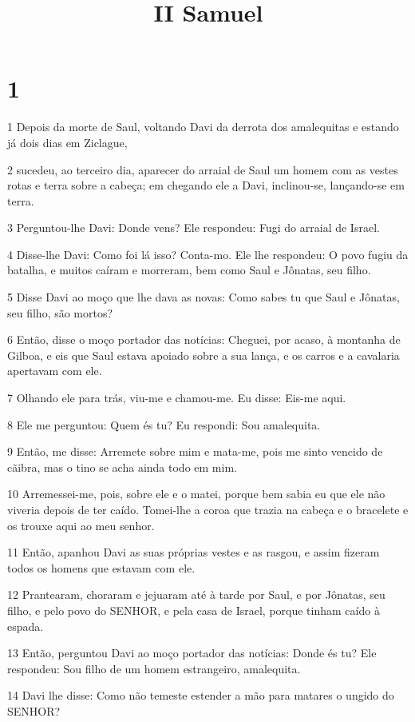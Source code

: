 

\title{II Samuel}


\chapter{1}

\par 1 Depois da morte de Saul, voltando Davi da derrota dos amalequitas e estando já dois dias em Ziclague,
\par 2 sucedeu, ao terceiro dia, aparecer do arraial de Saul um homem com as vestes rotas e terra sobre a cabeça; em chegando ele a Davi, inclinou-se, lançando-se em terra.
\par 3 Perguntou-lhe Davi: Donde vens? Ele respondeu: Fugi do arraial de Israel.
\par 4 Disse-lhe Davi: Como foi lá isso? Conta-mo. Ele lhe respondeu: O povo fugiu da batalha, e muitos caíram e morreram, bem como Saul e Jônatas, seu filho.
\par 5 Disse Davi ao moço que lhe dava as novas: Como sabes tu que Saul e Jônatas, seu filho, são mortos?
\par 6 Então, disse o moço portador das notícias: Cheguei, por acaso, à montanha de Gilboa, e eis que Saul estava apoiado sobre a sua lança, e os carros e a cavalaria apertavam com ele.
\par 7 Olhando ele para trás, viu-me e chamou-me. Eu disse: Eis-me aqui.
\par 8 Ele me perguntou: Quem és tu? Eu respondi: Sou amalequita.
\par 9 Então, me disse: Arremete sobre mim e mata-me, pois me sinto vencido de cãibra, mas o tino se acha ainda todo em mim.
\par 10 Arremessei-me, pois, sobre ele e o matei, porque bem sabia eu que ele não viveria depois de ter caído. Tomei-lhe a coroa que trazia na cabeça e o bracelete e os trouxe aqui ao meu senhor.
\par 11 Então, apanhou Davi as suas próprias vestes e as rasgou, e assim fizeram todos os homens que estavam com ele.
\par 12 Prantearam, choraram e jejuaram até à tarde por Saul, e por Jônatas, seu filho, e pelo povo do SENHOR, e pela casa de Israel, porque tinham caído à espada.
\par 13 Então, perguntou Davi ao moço portador das notícias: Donde és tu? Ele respondeu: Sou filho de um homem estrangeiro, amalequita.
\par 14 Davi lhe disse: Como não temeste estender a mão para matares o ungido do SENHOR?
